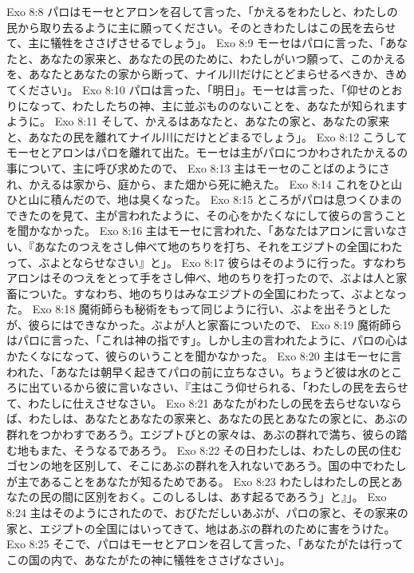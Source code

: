 Exo 8:8  パロはモーセとアロンを召して言った、「かえるをわたしと、わたしの民から取り去るように主に願ってください。そのときわたしはこの民を去らせて、主に犠牲をささげさせるでしょう」。
Exo 8:9  モーセはパロに言った、「あなたと、あなたの家来と、あなたの民のために、わたしがいつ願って、このかえるを、あなたとあなたの家から断って、ナイル川だけにとどまらせるべきか、きめてください」。
Exo 8:10  パロは言った、「明日」。モーセは言った、「仰せのとおりになって、わたしたちの神、主に並ぶもののないことを、あなたが知られますように。
Exo 8:11  そして、かえるはあなたと、あなたの家と、あなたの家来と、あなたの民を離れてナイル川にだけとどまるでしょう」。
Exo 8:12  こうしてモーセとアロンはパロを離れて出た。モーセは主がパロにつかわされたかえるの事について、主に呼び求めたので、
Exo 8:13  主はモーセのことばのようにされ、かえるは家から、庭から、また畑から死に絶えた。
Exo 8:14  これをひと山ひと山に積んだので、地は臭くなった。
Exo 8:15  ところがパロは息つくひまのできたのを見て、主が言われたように、その心をかたくなにして彼らの言うことを聞かなかった。
Exo 8:16  主はモーセに言われた、「あなたはアロンに言いなさい、『あなたのつえをさし伸べて地のちりを打ち、それをエジプトの全国にわたって、ぶよとならせなさい』と」。
Exo 8:17  彼らはそのように行った。すなわちアロンはそのつえをとって手をさし伸べ、地のちりを打ったので、ぶよは人と家畜についた。すなわち、地のちりはみなエジプトの全国にわたって、ぶよとなった。
Exo 8:18  魔術師らも秘術をもって同じように行い、ぶよを出そうとしたが、彼らにはできなかった。ぶよが人と家畜についたので、
Exo 8:19  魔術師らはパロに言った、「これは神の指です」。しかし主の言われたように、パロの心はかたくなになって、彼らのいうことを聞かなかった。
Exo 8:20  主はモーセに言われた、「あなたは朝早く起きてパロの前に立ちなさい。ちょうど彼は水のところに出ているから彼に言いなさい、『主はこう仰せられる、「わたしの民を去らせて、わたしに仕えさせなさい。
Exo 8:21  あなたがわたしの民を去らせないならば、わたしは、あなたとあなたの家来と、あなたの民とあなたの家とに、あぶの群れをつかわすであろう。エジプトびとの家々は、あぶの群れで満ち、彼らの踏む地もまた、そうなるであろう。
Exo 8:22  その日わたしは、わたしの民の住むゴセンの地を区別して、そこにあぶの群れを入れないであろう。国の中でわたしが主であることをあなたが知るためである。
Exo 8:23  わたしはわたしの民とあなたの民の間に区別をおく。このしるしは、あす起るであろう」と』」。
Exo 8:24  主はそのようにされたので、おびただしいあぶが、パロの家と、その家来の家と、エジプトの全国にはいってきて、地はあぶの群れのために害をうけた。
Exo 8:25  そこで、パロはモーセとアロンを召して言った、「あなたがたは行ってこの国の内で、あなたがたの神に犠牲をささげなさい」。
